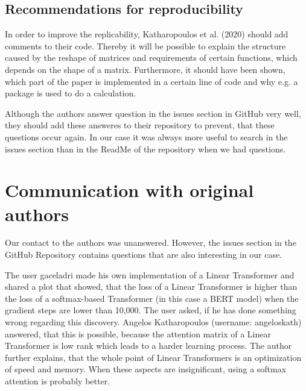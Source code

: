 \documentclass[DIV=13,fontsize=11pt]{scrartcl}
\begin{document}


\subsection{Recommendations for reproducibility}
In order to improve the replicability, Katharopoulos et al. (2020) should add comments to their code. Thereby it will be possible to explain the structure caused by the reshape of matrices and requirements of certain functions, which depends on the shape of a matrix. Furthermore,  it should have been shown, which part of the paper is implemented in a certain line of code and why e.g. a package is used to do a calculation.

Although the authors answer question in the issues section in GitHub very well, they should add these answeres to their repository to prevent, that these questions occur again. In our case it was always more useful to search in the issues section than in the ReadMe of the repository when we had questions.


\section{Communication with original authors}
Our contact to the authors was unanswered. However, the issues section in the GitHub Repository contains questions that are also interesting in our case.

The user gaceladri made his own implementation of a Linear Transformer and shared a plot that showed, that the loss of a Linear Transformer is higher than the loss of a softmax-based Transformer (in this case a BERT model) when the gradient steps are lower than 10,000.  The user asked, if he has done something wrong regarding this discovery. Angelos Katharopoulos (username: angeloskath) answered, that this is possible, because the attention matrix of a Linear Transformer is low rank which leads to a harder learning process. The author further explains, that the whole point of Linear Transformers is an optimization of speed and memory. When these aspects are insignificant, using a softmax attention is probably better. 
\end{document}
